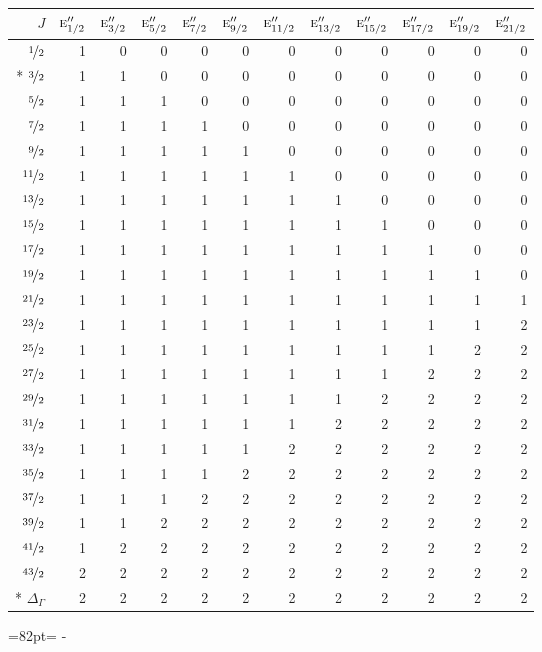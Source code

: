 \documentclass[10pt,a4paper]{article}
\makeatletter
\def\grouprule#1#2{\noalign{\marks\LTgroupmarks{\the\belowrulesep}\nobreak\vskip#1%
  \vskip\aboverulesep}\multispan\LT@cols\unskip{\leaders\hrule\@height#2\hfill\kern\z@}\cr
  \noalign{\penalty\LTrulebreak\vskip\belowrulesep\global\@lastruleclass\z@}}
\newcommand{\needspace}[1]{\par\penalty-100\begingroup\dimen0=#1\relax\dimen2=\pagegoal
  \advance\dimen2-\pagetotal\ifdim\dimen0>\dimen2\relax\ifdim\dimen2>0pt\vfil\break\fi\fi
  \endgroup}
\numberwithin{equation}{section}
\newcommand{\irr}[1]{\text{\normalfont\scshape #1}}
\makeatother
\begin{document}
{\small\begin{longtable}{@{}rrrrrrrrrrrr@{}}\toprule
$J$ & $\irr{e}_{1/2}''$ & $\irr{e}_{3/2}''$ & $\irr{e}_{5/2}''$ & $\irr{e}_{7/2}''$ & $\irr{e}_{9/2}''$ & $\irr{e}_{11/2}''$ & $\irr{e}_{13/2}''$ & $\irr{e}_{15/2}''$ & $\irr{e}_{17/2}''$ & $\irr{e}_{19/2}''$ & $\irr{e}_{21/2}''$\\\midrule\endhead
\bottomrule\endfoot\endlastfoot
$\nicefrac{1}{2}$ & 1 & 0 & 0 & 0 & 0 & 0 & 0 & 0 & 0 & 0 & 0\\*
$\nicefrac{3}{2}$ & 1 & 1 & 0 & 0 & 0 & 0 & 0 & 0 & 0 & 0 & 0\\
$\nicefrac{5}{2}$ & 1 & 1 & 1 & 0 & 0 & 0 & 0 & 0 & 0 & 0 & 0\\
$\nicefrac{7}{2}$ & 1 & 1 & 1 & 1 & 0 & 0 & 0 & 0 & 0 & 0 & 0\\
$\nicefrac{9}{2}$ & 1 & 1 & 1 & 1 & 1 & 0 & 0 & 0 & 0 & 0 & 0\\
$\nicefrac{11}{2}$ & 1 & 1 & 1 & 1 & 1 & 1 & 0 & 0 & 0 & 0 & 0\\
$\nicefrac{13}{2}$ & 1 & 1 & 1 & 1 & 1 & 1 & 1 & 0 & 0 & 0 & 0\\
$\nicefrac{15}{2}$ & 1 & 1 & 1 & 1 & 1 & 1 & 1 & 1 & 0 & 0 & 0\\
$\nicefrac{17}{2}$ & 1 & 1 & 1 & 1 & 1 & 1 & 1 & 1 & 1 & 0 & 0\\
$\nicefrac{19}{2}$ & 1 & 1 & 1 & 1 & 1 & 1 & 1 & 1 & 1 & 1 & 0\\
$\nicefrac{21}{2}$ & 1 & 1 & 1 & 1 & 1 & 1 & 1 & 1 & 1 & 1 & 1\\
$\nicefrac{23}{2}$ & 1 & 1 & 1 & 1 & 1 & 1 & 1 & 1 & 1 & 1 & 2\\
$\nicefrac{25}{2}$ & 1 & 1 & 1 & 1 & 1 & 1 & 1 & 1 & 1 & 2 & 2\\
$\nicefrac{27}{2}$ & 1 & 1 & 1 & 1 & 1 & 1 & 1 & 1 & 2 & 2 & 2\\
$\nicefrac{29}{2}$ & 1 & 1 & 1 & 1 & 1 & 1 & 1 & 2 & 2 & 2 & 2\\
$\nicefrac{31}{2}$ & 1 & 1 & 1 & 1 & 1 & 1 & 2 & 2 & 2 & 2 & 2\\
$\nicefrac{33}{2}$ & 1 & 1 & 1 & 1 & 1 & 2 & 2 & 2 & 2 & 2 & 2\\
$\nicefrac{35}{2}$ & 1 & 1 & 1 & 1 & 2 & 2 & 2 & 2 & 2 & 2 & 2\\
$\nicefrac{37}{2}$ & 1 & 1 & 1 & 2 & 2 & 2 & 2 & 2 & 2 & 2 & 2\\
$\nicefrac{39}{2}$ & 1 & 1 & 2 & 2 & 2 & 2 & 2 & 2 & 2 & 2 & 2\\
$\nicefrac{41}{2}$ & 1 & 2 & 2 & 2 & 2 & 2 & 2 & 2 & 2 & 2 & 2\\
$\nicefrac{43}{2}$ & 2 & 2 & 2 & 2 & 2 & 2 & 2 & 2 & 2 & 2 & 2\\*
\grouprule{0pt}{\lightrulewidth} $\Delta_\Gamma$ & 2 & 2 & 2 & 2 & 2 & 2 & 2 & 2 & 2 & 2 & 2\\
\bottomrule\end{longtable}}
\needspace{82pt}
\end{document}
